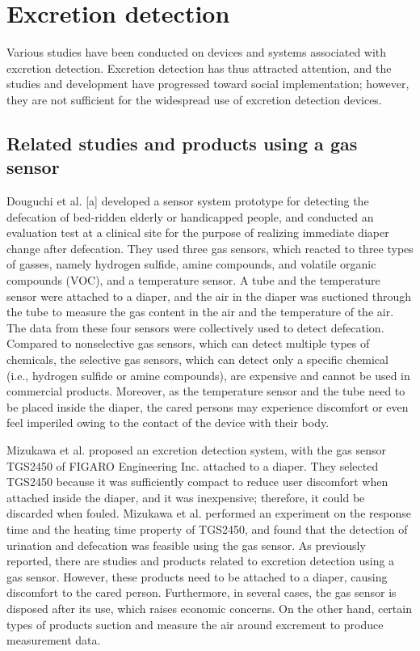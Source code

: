 \documentclass[publish,JRM,paper]{jaciiiarticle}
\begin{document}
\section{Excretion detection}
Various studies have been conducted on devices and systems associated with excretion detection. Excretion detection has thus attracted attention, and the studies and development have progressed toward social implementation; however, they are not sufficient for the widespread use of excretion detection devices.

\subsection{Related studies and products using a gas sensor}
Douguchi et al. \cite{doguchi2}[a] developed a sensor system prototype for detecting the defecation of bed-ridden elderly or handicapped people, and conducted an evaluation test at a clinical site for the purpose of realizing immediate diaper change after defecation. They used three gas sensors, which reacted to three types of gasses, namely hydrogen sulfide, amine compounds, and volatile organic compounds (VOC), and a temperature sensor. A tube and the temperature sensor were attached to a diaper, and the air in the diaper was suctioned through the tube to measure the gas content in the air and the temperature of the air. The data from these four sensors were collectively used to detect defecation. Compared to nonselective gas sensors, which can detect multiple types of chemicals, the selective gas sensors, which can detect only a specific chemical (i.e., hydrogen sulfide or amine compounds), are expensive and cannot be used in commercial products. Moreover, as the temperature sensor and the tube need to be placed inside the diaper, the cared persons may experience discomfort or even feel imperiled owing to the contact of the device with their body.

Mizukawa et al. \cite{mizukawa} proposed an excretion detection system, with the gas sensor TGS2450 of FIGARO Engineering Inc. attached to a diaper. They selected TGS2450 because it was sufficiently compact to reduce user discomfort when attached inside the diaper, and it was inexpensive; therefore, it could be discarded when fouled. Mizukawa et al. performed an experiment on the response time and the heating time property of TGS2450, and found that the detection of urination and defecation was feasible using the gas sensor.
As previously reported, there are studies and products related to excretion detection using a gas sensor. However, these products need to be attached to a diaper, causing discomfort to the cared person. Furthermore, in several cases, the gas sensor is disposed after its use, which raises economic concerns. On the other hand, certain types of products suction and measure the air around excrement to produce measurement data.
\end{document}
